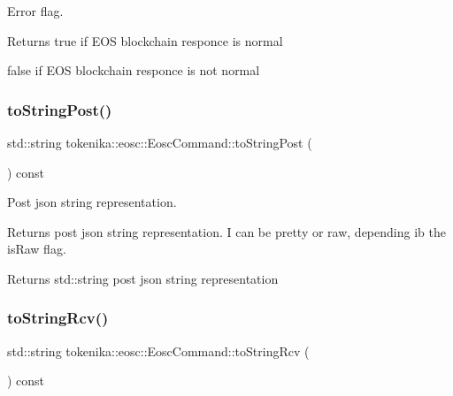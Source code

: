 Error flag. 

\begin{DoxyReturn}{Returns}
true if E\+OS blockchain responce is normal 

false if E\+OS blockchain responce is not normal 
\end{DoxyReturn}
\mbox{\label{classtokenika_1_1eosc_1_1_eosc_command_a1cb0362dceb5999e7e06078223b20d91}} 
\subsubsection{\texorpdfstring{to\+String\+Post()}{toStringPost()}}
{\footnotesize\ttfamily std\+::string tokenika\+::eosc\+::\+Eosc\+Command\+::to\+String\+Post (\begin{DoxyParamCaption}{ }\end{DoxyParamCaption}) const}



Post json string representation. 

Returns post json string representation. I can be pretty or raw, depending ib the {\ttfamily is\+Raw} flag.

\begin{DoxyReturn}{Returns}
std\+::string post json string representation 
\end{DoxyReturn}
\mbox{\label{classtokenika_1_1eosc_1_1_eosc_command_ad01ef46444d9d8bc708b5d18605c3903}} 
\subsubsection{\texorpdfstring{to\+String\+Rcv()}{toStringRcv()}}
{\footnotesize\ttfamily std\+::string tokenika\+::eosc\+::\+Eosc\+Command\+::to\+String\+Rcv (\begin{DoxyParamCaption}{ }\end{DoxyParamCaption}) const}



